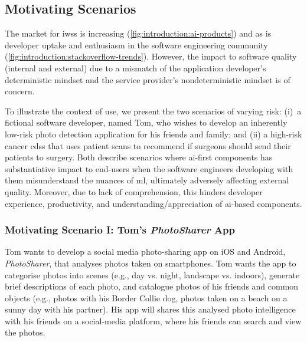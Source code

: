 \subsection{Motivating Scenarios}
\label{ssec:introduction:motivation:scenario}





The market for \glspl{iws} is increasing (\cref{fig:introduction:ai-products}) and as is developer uptake and enthusiasm in the software engineering community (\cref{fig:introduction:stackoverflow-trends}). However, the impact to software quality (internal and external) due to a mismatch of the application developer's deterministic  mindset and the service provider's nondeterministic mindset is of concern.

To illustrate the context of use, we present the two scenarios of varying risk: (i)~a fictional software developer, named Tom, who wishes to develop an inherently low-risk photo detection application for his friends and family; and (ii) a high-risk cancer \gls{cdss} that uses patient scans to recommend if surgeons should send their patients to surgery. Both describe scenarios where \gls{ai}-first components has substantiative impact to end-users when the software engineers developing with them misunderstand the nuances of \gls{ml}, ultimately adversely affecting external quality. Moreover, due to lack of comprehension, this hinders developer experience, productivity, and understanding/appreciation of \gls{ai}-based components.
  
\subsubsection{Motivating Scenario I: Tom's \textit{PhotoSharer} App}
\label{ssec:introduction:motivation:scenario:pam}

Tom wants to develop a social media photo-sharing app on iOS and Android, \textit{PhotoSharer}, that analyses photos taken on smartphones. Tom wants the app to categorise photos into scenes (e.g., day vs. night, landscape vs. indoors), generate brief descriptions of each photo, and catalogue photos of his friends and common objects (e.g., photos with his Border Collie dog, photos taken on a beach on a sunny day with his partner). His app will shares this analysed photo intelligence with his friends on a social-media platform, where his friends can search and view the photos.

